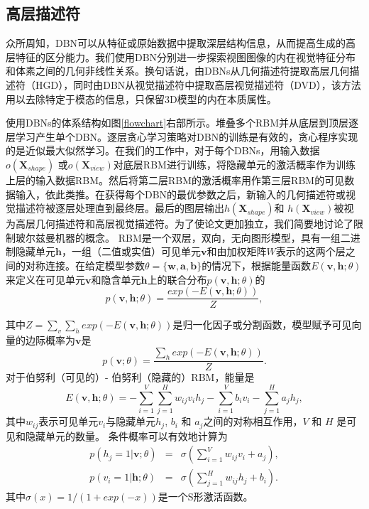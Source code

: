 \subsection{高层描述符}

众所周知，DBN可以从特征或原始数据中提取深层结构信息，从而提高生成的高层特征的区分能力。我们使用DBN分别进一步探索视图图像的内在视觉特征分布和体素之间的几何非线性关系。换句话说，由DBNs从几何描述符提取高层几何描述符（HGD），同时由DBN从视觉描述符中提取高层视觉描述符（DVD），该方法用以去除特定于模态的信息，只保留3D模型的内在本质属性。

使用DBNs的体系结构如图\ref{flowchart}右部所示。堆叠多个RBM并从底层到顶层逐层学习产生单个DBN。逐层贪心学习策略\cite{Hinton2006A}对DBN的训练是有效的，贪心程序实现的是近似最大似然学习。在我们的工作中，对于每个DBNs，用输入数据$o(\mathbf{X}_{shape})$ 或$o(\mathbf{X}_{view})$对底层RBM进行训练，将隐藏单元的激活概率作为训练上层的输入数据RBM。然后将第二层RBM的激活概率用作第三层RBM的可见数据输入，依此类推。在获得每个DBN的最优参数之后，新输入的几何描述符或视觉描述符被逐层处理直到最终层。最后的图层输出$h(\mathbf{X}_{shape})$和 $h(\mathbf{X}_{view})$被视为高层几何描述符和高层视觉描述符。为了使论文更加独立，我们简要地讨论了限制玻尔兹曼机器的概念。 RBM是一个双层，双向，无向图形模型，具有一组二进制隐藏单元$\mathbf{h}$，一组（二值或实值）可见单元$\mathbf{v}$和由加权矩阵$W$表示的这两个层之间的对称连接。在给定模型参数$\theta=\{\mathbf{w}, \mathbf{a}, \mathbf{b}\}$的情况下，根据能量函数$E(\mathbf{v}, \mathbf{h}; \theta)$ 来定义在可见单元$\mathbf{v}$和隐含单元$\mathbf{h}$上的联合分布$p(\mathbf{v},\mathbf{h}; \theta)$的
%
\begin{equation}
 p(\mathbf{v}, \mathbf{h}; \theta) = \frac{exp(-E(\mathbf{v}, \mathbf{h}; \theta))}{Z},
\end{equation}
%

其中$Z=\sum_v\sum_h exp(-E(\mathbf{v}, \mathbf{h}; \theta))$是归一化因子或分割函数，模型赋予可见向量的边际概率为$ \mathbf {v} $是
%
\begin{equation}
 p(\mathbf{v}; \theta) = \frac{\sum_h exp(-E(\mathbf{v}, \mathbf{h}; \theta))}{Z}.
\end{equation}
%
对于伯努利（可见的）- 伯努利（隐藏的）RBM，能量是
%
\begin{equation}
 E(\mathbf{v},\mathbf{h}; \theta) = -\sum_{i=1}^{V} \sum_{j=1}^{H} w_{ij}v_i h_j - \sum_{i=1}^V b_i v_i - \sum_{j=1}^H a_j h_j,
\end{equation}
%
其中$w_{ij}$表示可见单元$v_i$与隐藏单元$h_j$, $b_i$ 和 $a_j$之间的对称相互作用，$V$ 和 $H$ 是可见和隐藏单元的数量。 条件概率可以有效地计算为
%
\begin{eqnarray}
 p(h_j=1|\mathbf{v};\theta) & = & \sigma \left( \sum_{i=1}^V w_{ij} v_i + a_j \right), \label{eqn_rbm_h} \\
 p(v_i=1|\mathbf{h};\theta) & = & \sigma \left( \sum_{j=1}^H w_{ij} h_j + b_i \right).
\end{eqnarray}
%
其中$\sigma(x)=1/(1+exp(-x))$是一个S形激活函数。

